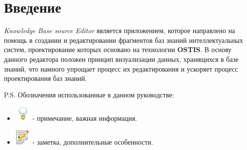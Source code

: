 \section{Введение}

\textit{Knowledge Base source Editor} является приложением, которое направлено на помощь в создании и редактировании фрагментов баз знаний интеллектуальных систем, проектирование которых основано на технологии \textbf{OSTIS}. В основу данного редактора положен принцип визуализации данных, хранящихся в базе знаний, что намного упрощает процесс их редактирования и ускоряет процесс проектирования баз знаний.

P.S. Обозначения использованные в данном руководстве:
\begin{itemize}
	\item
		\includegraphics[width=30px, height=30px]{../images/lamp.png}
 - примечание, важная информация.
	\item 
		\includegraphics[width=30px, height=30px]{../images/note.png}
 - заметка, дополнительные особенности.
\end{itemize}
 


